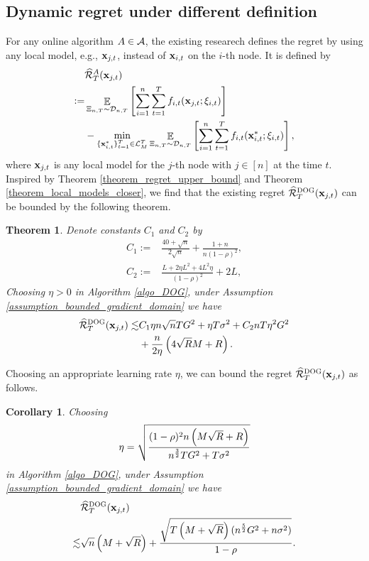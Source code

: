 \documentclass{article}
\newtheorem{Theorem}{\bf{Theorem}}
\newtheorem{Corollary}{\bf{Corollary}}
\begin{document}
\subsection{Dynamic regret under different definition}
For any online algorithm $A\in{\mathcal{A}}$, the existing researech \citet{pmlr-v70-zhang17g} defines the regret by using any local model, e.g., ${\bf x}_{j,t}$, instead of ${\bf x}_{i,t}$ on the $i$-th node. It is defined by 
\begin{align}
\label{equa_define_other_regret}
& \widehat{{\mathcal{R}}}_T^{A}({\bf x}_{j,t}) \\ \nonumber
:= & \mathop{\mathbb{E}}_{\Xi_{n,T} \sim \mathcal{D}_{n,T}}\left [\sum_{i=1}^n \sum_{t=1}^T f_{i,t}({\bf x}_{j,t};\xi_{i,t})\right ] \\ \nonumber
& - \min_{\{{\bf x}_{i,t}^\ast\}_{t=1}^T \in {\mathcal{L}}_M^T} \mathop{\mathbb{E}}_{\Xi_{n,T} \sim \mathcal{D}_{n,T}} \left [\sum_{i=1}^n \sum_{t=1}^T f_{i,t}({\bf x}_{i,t}^\ast;\xi_{i,t})\right ],
\end{align} 
where ${\bf x}_{j,t}$ is any local model for the $j$-th node with $j\in[n]$ at the time $t$. Inspired by Theorem \ref{theorem_regret_upper_bound} and Theorem \ref{theorem_local_models_closer}, we find that the existing regret $\widehat{{\mathcal{R}}}_T^{\textsc{DOG}}({\bf x}_{j,t})$ can be bounded by the following theorem.
\begin{Theorem}
\label{theorem_implied_other_regret_bound}
Denote constants $C_1$ and $C_2$ by
\begin{align}
\nonumber
C_1 := & \frac{40+\sqrt{n}}{2\sqrt{n}} + \frac{1+n}{n(1-\rho)^2}, \\ \nonumber
C_2 := & \frac{L + 2\eta L^2  + 4L^2 \eta}{(1-\rho)^2} +2L,
\end{align} Choosing $\eta>0$ in Algorithm \ref{algo_DOG}, under Assumption \ref{assumption_bounded_gradient_domain} we have
\begin{align}
\nonumber
\widehat{{\mathcal{R}}}_T^{\textsc{DOG}}({\bf x}_{j,t}) \lesssim & C_1 \eta n\sqrt{n} T G^2 +\eta T\sigma^2 + C_2  nT\eta^2 G^2  \\ \nonumber
&  + \frac{n}{2\eta}\left(  4\sqrt{R}M + R   \right).
\end{align}
\end{Theorem} Choosing an appropriate learning rate $\eta$, we  can bound the regret $\widehat{{\mathcal{R}}}_T^{\textsc{DOG}}({\bf x}_{j,t})$ as follows.
\begin{Corollary}
\label{corollary_implied_other_regret_bound}
Choosing 
\begin{align}
\nonumber
\eta = \sqrt{\frac{(1-\rho)^2 n\left( M\sqrt{R} + R \right)}{ n^{\frac{3}{2}}TG^2 + T\sigma^2 }}
\end{align} in Algorithm \ref{algo_DOG}, under Assumption \ref{assumption_bounded_gradient_domain} we have
\begin{align}
\nonumber
& \widehat{{\mathcal{R}}}_T^{\textsc{DOG}}({\bf x}_{j,t}) \\ \nonumber
\lesssim & \sqrt{n}\left( M+\sqrt{R} \right) + \frac{\sqrt{T\left( M+\sqrt{R} \right)(n^\frac{5}{2}G^2 + n\sigma^2)}}{1-\rho}.
\end{align}
\end{Corollary} 
\end{document}
